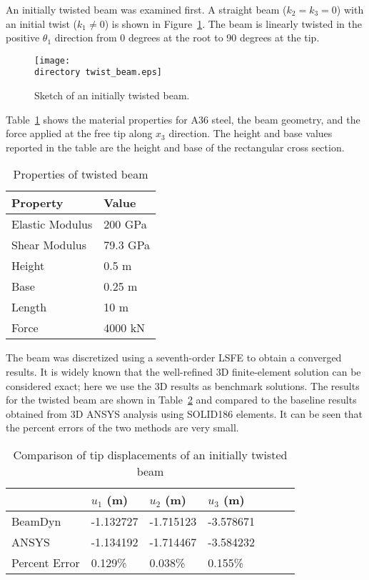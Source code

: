 \documentclass{aiaa-tc}
\def\directory{EPSF/}
\begin{document}
An initially twisted beam was examined first. A straight beam ($k_2=k_3=0$) with an initial twist ($k_1\neq 0$) is shown in Figure~\ref{Twist1}. The beam is linearly twisted in the positive $\theta_1$ direction from 0 degrees at the root to 90 degrees at the tip.
\begin{figure}
\centering
\texttt{[image: \\directory twist\_beam.eps]}
\caption{Sketch of an initially twisted beam.} 
\label{Twist1}
\end{figure}
 Table~\ref{E1Property} shows the material properties for A36 steel, the beam geometry, and the force applied at the free tip along $x_3$ direction. The height and base values reported in the table are the height and base of the rectangular cross section. 
 \begin{table}
\caption{\label{E1Property} Properties of twisted beam}
\begin{center}
    \begin{tabular}{| l | l |}
    	\hline
    	Property               & Value   \\ \hline
    	Elastic Modulus                      & 200 GPa \\ \hline
    	Shear Modulus                      & 79.3 GPa \\ \hline
    	Height                      & 0.5 m   \\ \hline
    	Base                      & 0.25 m  \\ \hline
    	Length                      & 10 m    \\ \hline
    	Force                      & 4000 kN \\ \hline
    \end{tabular}
\end{center}
\end{table}
The beam was discretized using a seventh-order LSFE to obtain a converged results. It is widely known that the well-refined 3D finite-element solution can be considered exact; here we use the 3D results as benchmark solutions. The results for the twisted beam are shown in Table~\ref{E1u} and compared to the baseline results obtained from 3D ANSYS analysis using SOLID186 elements. It can be seen that the percent errors of the two methods are very small.
\begin{table}
\caption{\label{E1u} Comparison of tip displacements of an initially twisted beam} 
\begin{center} 
    \begin{tabular}{| l | l | l | l | l | l | l |}
    	\hline
    	        & $u_1$ (m) & $u_2$ (m) & $u_3$ (m)  \\ \hline
    	BeamDyn  & -1.132727     & -1.715123       & -3.578671      \\  \hline
    	ANSYS   & -1.134192     & -1.714467      & -3.584232     \\ \hline
    	Percent Error   & 0.129\%     & 0.038\%      & 0.155\%     \\ \hline
    \end{tabular}
\end{center}
\end{table} 
\end{document}
